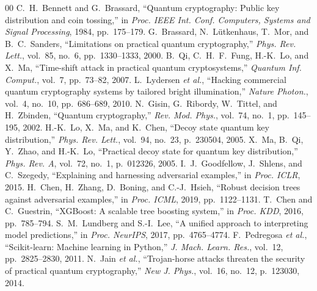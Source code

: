 \documentclass[conference]{IEEEtran}
\begin{document}
\begin{thebibliography}{00}
 C.~H.~Bennett and G.~Brassard, ``Quantum cryptography: Public key distribution and coin tossing,'' in \textit{Proc. IEEE Int. Conf. Computers, Systems and Signal Processing}, 1984, pp.~175--179.
 G.~Brassard, N.~L\"{u}tkenhaus, T.~Mor, and B.~C.~Sanders, ``Limitations on practical quantum cryptography,'' \textit{Phys. Rev. Lett.}, vol.~85, no.~6, pp.~1330--1333, 2000.
 B.~Qi, C.~H.~F.~Fung, H.-K.~Lo, and X.~Ma, ``Time-shift attack in practical quantum cryptosystems,'' \textit{Quantum Inf. Comput.}, vol.~7, pp.~73--82, 2007.
 L.~Lydersen \textit{et al.}, ``Hacking commercial quantum cryptography systems by tailored bright illumination,'' \textit{Nature Photon.}, vol.~4, no.~10, pp.~686--689, 2010.
 N.~Gisin, G.~Ribordy, W.~Tittel, and H.~Zbinden, ``Quantum cryptography,'' \textit{Rev. Mod. Phys.}, vol.~74, no.~1, pp.~145--195, 2002.
 H.-K.~Lo, X.~Ma, and K.~Chen, ``Decoy state quantum key distribution,'' \textit{Phys. Rev. Lett.}, vol.~94, no.~23, p.~230504, 2005.
 X.~Ma, B.~Qi, Y.~Zhao, and H.-K.~Lo, ``Practical decoy state for quantum key distribution,'' \textit{Phys. Rev. A}, vol.~72, no.~1, p.~012326, 2005.
 I.~J.~Goodfellow, J.~Shlens, and C.~Szegedy, ``Explaining and harnessing adversarial examples,'' in \textit{Proc. ICLR}, 2015.
 H.~Chen, H.~Zhang, D.~Boning, and C.-J.~Hsieh, ``Robust decision trees against adversarial examples,'' in \textit{Proc. ICML}, 2019, pp.~1122--1131.
 T.~Chen and C.~Guestrin, ``XGBoost: A scalable tree boosting system,'' in \textit{Proc. KDD}, 2016, pp.~785--794.
 S.~M.~Lundberg and S.-I.~Lee, ``A unified approach to interpreting model predictions,'' in \textit{Proc. NeurIPS}, 2017, pp.~4765--4774.
 F.~Pedregosa \textit{et al.}, ``Scikit-learn: Machine learning in Python,'' \textit{J. Mach. Learn. Res.}, vol.~12, pp.~2825--2830, 2011.
 N.~Jain \textit{et al.}, ``Trojan-horse attacks threaten the security of practical quantum cryptography,'' \textit{New J. Phys.}, vol.~16, no.~12, p.~123030, 2014.
\end{thebibliography}
\end{document}
